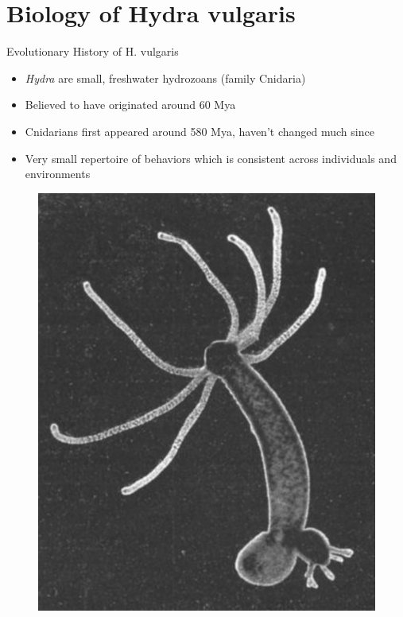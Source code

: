 \documentclass[leqno,presentation,unknownkeysallowed]{beamer}
\begin{document}
\section{Biology of Hydra vulgaris}

\begin{frame}{Evolutionary History of H. vulgaris}
\begin{itemize}
\item \textit{Hydra} are small, freshwater hydrozoans (family Cnidaria)
\item Believed to have originated around 60 Mya
\item Cnidarians first appeared around 580 Mya, haven't changed much since
\item Very small repertoire of behaviors which is consistent across individuals and environments
\end{itemize}
\begin{figure}
\center
\includegraphics[scale=0.20]{hydra.png}
\end{figure}
\end{frame}
\end{document}
